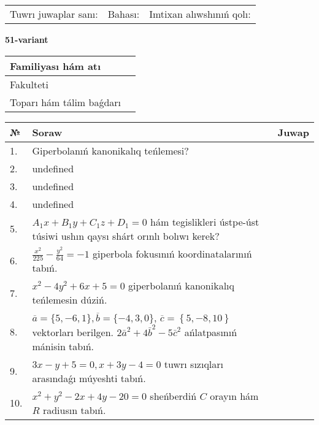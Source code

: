 \documentclass{article}
\begin{document}
\vspace{0.7cm}

\begin{tabular}{lll}
Tuwrı juwaplar sanı: \underline{\hspace{1cm}} & 
Bahası: \underline{\hspace{1cm}} & 
Imtixan alıwshınıń qolı: \underline{\hspace{2cm}} \\
\end{tabular}

\egroup

\newpage


\textbf{51-variant}\\

\bgroup
\def\arraystretch{1.6} %

\begin{tabular}{|m{5.7cm}|m{9.5cm}|}
\hline
Familiyası hám atı & \\
\hline
Fakulteti  & \\
\hline
Toparı hám tálim baǵdarı  & \\
\hline
\end{tabular}

\vspace{0.7cm}

\begin{tabular}{|m{0.7cm}|m{10cm}|m{4cm}|}
\hline
№ & Soraw & Juwap \\
\hline
1. & Giperbolanıń kanonikalıq teńlemesi? &  \\
\hline
2. & undefined &  \\
\hline
3. & undefined &  \\
\hline
4. & undefined &  \\
\hline
5. & \(A_{1}x + B_{1}y + C_{1}z + D_{1} = 0\) hám tegislikleri ústpe-úst túsiwi ushın qaysı shárt orınlı bolıwı kerek? &  \\
\hline
6. & \(\frac{x^{2}}{225} - \frac{y^{2}}{64} = - 1\) giperbola fokusınıń koordinatalarınıń tabıń. &  \\
\hline
7. & \(x^{2} - 4 y^{2} + 6 x + 5 = 0\) giperbolanıń kanonikalıq teńlemesin dúziń. &  \\
\hline
8. & \(\overline{a} = \{5,- 6, 1 \}, \overline{b} = \{ - 4, 3, 0 \} \), \(\overline{c} = \left\{ 5,- 8, 10 \right\}\) vektorları berilgen. \(2{\bar{a}}^{2} + 4{\bar{b}}^{2} - 5{\bar{c}}^{2}\) ańlatpasınıń mánisin tabıń. &  \\
\hline
9. & \(3 x - y + 5 = 0, x + 3 y - 4 = 0\) tuwrı sızıqları arasındaǵı múyeshti tabıń. &  \\
\hline
10. & \(x^{2} + y^{2} - 2 x + 4 y - 20 = 0\) sheńberdiń \(C\) orayın hám \(R\) radiusın tabıń. & \\
\hline
\end{tabular}
\end{document}

